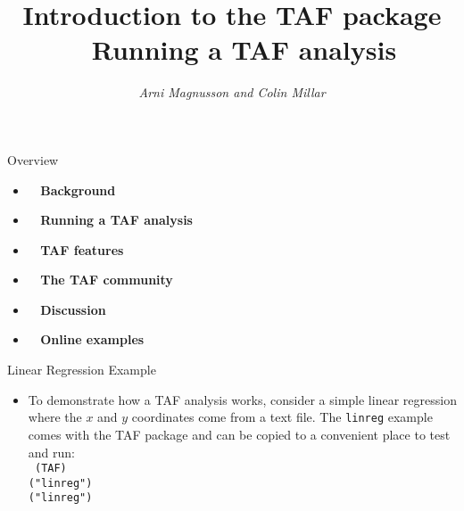 \documentclass[aspectratio=169]{beamer}
\begin{document}
\begin{frame}
  \title{\darkblue Introduction to the TAF package\\[1ex]
    \normalsize{}~ Running a TAF analysis}
  \author{\vspace{-16ex}\small\darkgray\it Arni Magnusson and Colin Millar}
  \date{}
  \titlepage
\end{frame}


\begin{frame}{Overview}
  \begin{itemize}
    \item[] {\bf{}~ Background} \\[3ex]
    \item[] {\bf{}~ Running a TAF analysis} \\[3ex]
    \item[] {\bf{}~ TAF features} \\[3ex]
    \item[] {\bf{}~ The TAF community} \\[3ex]
    \item[] {\bf{}~ Discussion} \\[3ex]
    \item[] {\bf{}~ Online examples} \\[3ex]
  \end{itemize}
\end{frame}


\begin{frame}{Linear Regression Example}\small
  \begin{itemize}
    \item[] To demonstrate how a TAF analysis works, consider a simple linear
    regression\\[0.2ex]
    where the $x$ and $y$ coordinates come from a text file. The
    {\tt\green linreg} example\\[0.2ex]
    comes with the TAF package and can be copied to a convenient place to
    test\\[0.2ex]
    and run:\\[4ex]\tt
    (TAF)\\[0.5ex]
    ("linreg")\\[0.5ex]
    ("linreg")
  \end{itemize}
\end{frame}
\end{document}
